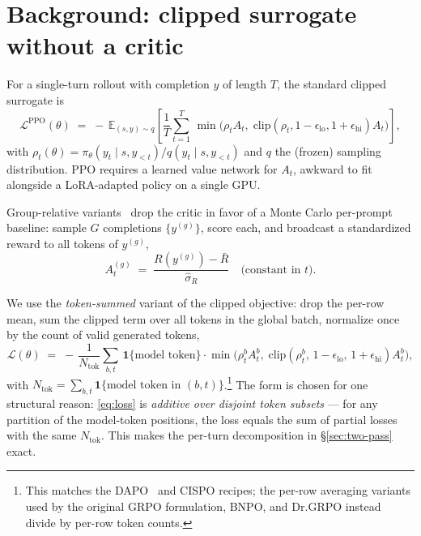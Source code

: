 \documentclass[11pt,a4paper]{article}
\begin{document}
\section{Background: clipped surrogate without a critic}

For a single-turn rollout with completion $y$ of length $T$, the standard
clipped surrogate is
\begin{equation}
\mathcal{L}^{\text{PPO}}(\theta) \;=\;
  -\,\mathbb{E}_{(s,y)\sim q}\!\left[
    \frac{1}{T}\sum_{t=1}^{T}\,
    \min\!\big(\rho_t A_t,\;
               \mathrm{clip}(\rho_t, 1-\epsilon_{\text{lo}}, 1+\epsilon_{\text{hi}}) A_t\big)
  \right],
  \label{eq:ppo}
\end{equation}
with $\rho_t(\theta) = \pi_\theta(y_t \mid s, y_{<t})/q(y_t\mid s, y_{<t})$
and $q$ the (frozen) sampling distribution. PPO requires a learned
value network for $A_t$, awkward to fit alongside a LoRA-adapted policy
on a single GPU.

Group-relative variants~\cite{shao2024deepseekmath} drop the critic
in favor of a Monte Carlo per-prompt baseline: sample $G$ completions
$\{y^{(g)}\}$, score each, and broadcast a standardized reward to all
tokens of $y^{(g)}$,
\begin{equation}
A^{(g)}_t \;=\; \frac{R(y^{(g)}) - \bar R}{\widehat\sigma_R}
\quad\text{(constant in $t$).}
\end{equation}

We use the \emph{token-summed} variant of the clipped objective: drop
the per-row mean, sum the clipped term over all tokens in the global
batch, normalize once by the count of valid generated tokens,
\begin{equation}
\mathcal{L}(\theta) \;=\;
 -\,\frac{1}{N_{\text{tok}}}\sum_{b,t}
   \,\mathbf{1}\{\text{model token}\}\cdot
   \min\!\big(\rho^b_t A^b_t,\;\mathrm{clip}(\rho^b_t,\,1-\epsilon_{\text{lo}},\,1+\epsilon_{\text{hi}}) A^b_t\big),
\label{eq:loss}
\end{equation}
with $N_{\text{tok}} = \sum_{b,t}\mathbf{1}\{\text{model token in }(b,t)\}$.\footnote{This
matches the DAPO~\cite{yu2025dapo} and CISPO recipes; the per-row
averaging variants used by the original GRPO formulation, BNPO, and
Dr.GRPO instead divide by per-row token counts.}
The form is chosen for one structural reason: \eqref{eq:loss} is
\emph{additive over disjoint token subsets} --- for any partition of the
model-token positions, the loss equals the sum of partial losses with
the same $N_{\text{tok}}$. This makes the per-turn decomposition in
\S\ref{sec:two-pass} exact.
\end{document}
